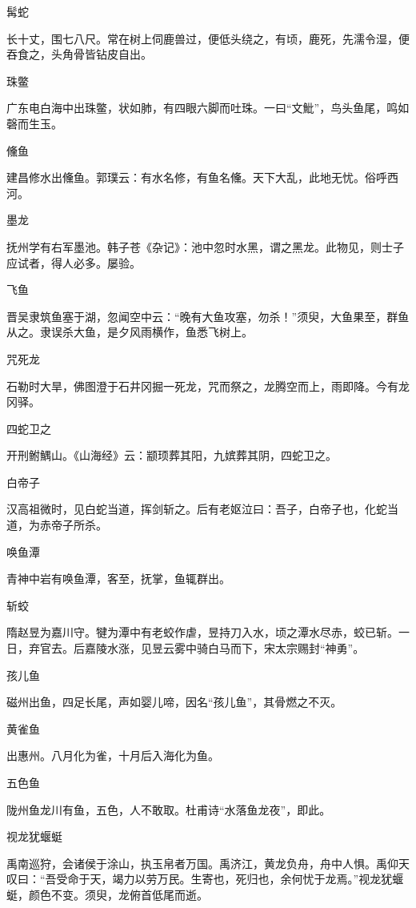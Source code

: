 \documentclass[a4paper,12pt,UTF8,twoside]{ctexbook}
\begin{document}
    髯蛇
    
    长十丈，围七八尺。常在树上伺鹿兽过，便低头绕之，有顷，鹿死，先濡令湿，便吞食之，头角骨皆钻皮自出。
    
    珠鳖
    
    广东电白海中出珠鳖，状如肺，有四眼六脚而吐珠。一曰“文魮”，鸟头鱼尾，鸣如磬而生玉。
    
    儵鱼
    
    建昌修水出儵鱼。郭璞云：有水名修，有鱼名儵。天下大乱，此地无忧。俗呼西河。
    
    墨龙
    
    抚州学有右军墨池。韩子苍《杂记》：池中忽时水黑，谓之黑龙。此物见，则士子应试者，得人必多。屡验。
    
    飞鱼
    
    晋吴隶筑鱼塞于湖，忽闻空中云：“晚有大鱼攻塞，勿杀！”须臾，大鱼果至，群鱼从之。隶误杀大鱼，是夕风雨横作，鱼悉飞树上。
    
    咒死龙
    
    石勒时大旱，佛图澄于石井冈掘一死龙，咒而祭之，龙腾空而上，雨即降。今有龙冈驿。
    
    四蛇卫之
    
    开刑鲋鰅山。《山海经》云：颛顼葬其阳，九嫔葬其阴，四蛇卫之。
    
    白帝子
    
    汉高祖微时，见白蛇当道，挥剑斩之。后有老妪泣曰：吾子，白帝子也，化蛇当道，为赤帝子所杀。
    
    唤鱼潭
    
    青神中岩有唤鱼潭，客至，抚掌，鱼辄群出。
    
    斩蛟
    
    隋赵昱为嘉川守。犍为潭中有老蛟作虐，昱持刀入水，顷之潭水尽赤，蛟已斩。一日，弃官去。后嘉陵水涨，见昱云雾中骑白马而下，宋太宗赐封“神勇”。
    
    孩儿鱼
    
    磁州出鱼，四足长尾，声如婴儿啼，因名“孩儿鱼”，其骨燃之不灭。
    
    黄雀鱼
    
    出惠州。八月化为雀，十月后入海化为鱼。
    
    五色鱼
    
    陇州鱼龙川有鱼，五色，人不敢取。杜甫诗“水落鱼龙夜”，即此。
    
    视龙犹蝘蜓
    
    禹南巡狩，会诸侯于涂山，执玉帛者万国。禹济江，黄龙负舟，舟中人惧。禹仰天叹曰：“吾受命于天，竭力以劳万民。生寄也，死归也，余何忧于龙焉。”视龙犹蝘蜓，颜色不变。须臾，龙俯首低尾而逝。
    
\end{document}

